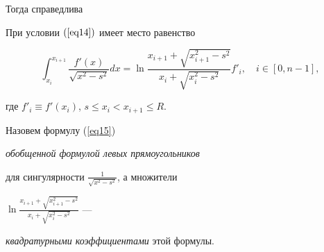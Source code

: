 Тогда справедлива 





\begin{lem}


При условии $(\ref{eq14})$ имеет место равенство


\begin{equation}


\label{eq15}


\int_{x_i}^{x_{i+1}}\frac{f'(x)}{\sqrt{x^2-s^2}}dx=


\ln\frac{x_{i+1}+\sqrt{x_{i+1}^2-s^2}}{x_i+\sqrt{x_i^2-s^2}}


f'_i, \quad i\in[0,n-1],


\end{equation}


где $f'_i\equiv f'(x_i)$, $s\le x_i<x_{i+1}\le R$.


\end{lem}








\begin{defn}


Назовем формулу (\ref{eq15})


{\it обобщенной формулой левых прямоугольников}


для сингулярности $\frac1{\sqrt{x^2-s^2}}$, а множители


$\ln\frac{x_{i+1}+\sqrt{x_{i+1}^2-s^2}}{x_i+\sqrt{x_i^2-s^2}}$ ---


{\it квадратурными коэффициентами} этой формулы. 


\end{defn}





